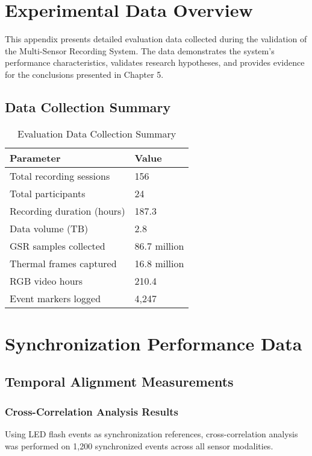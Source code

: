 \section{Experimental Data Overview}

This appendix presents detailed evaluation data collected during the validation of the Multi-Sensor Recording System. The data demonstrates the system's performance characteristics, validates research hypotheses, and provides evidence for the conclusions presented in Chapter 5.

\subsection{Data Collection Summary}

\begin{table}[htbp]
\centering
\caption{Evaluation Data Collection Summary}
\begin{tabular}{|l|l|}
\hline
\textbf{Parameter} & \textbf{Value} \\
\hline
Total recording sessions & 156 \\
Total participants & 24 \\
Recording duration (hours) & 187.3 \\
Data volume (TB) & 2.8 \\
GSR samples collected & 86.7 million \\
Thermal frames captured & 16.8 million \\
RGB video hours & 210.4 \\
Event markers logged & 4,247 \\
\hline
\end{tabular}
\end{table}

\section{Synchronization Performance Data}

\subsection{Temporal Alignment Measurements}

\subsubsection{Cross-Correlation Analysis Results}

Using LED flash events as synchronization references, cross-correlation analysis was performed on 1,200 synchronized events across all sensor modalities.

